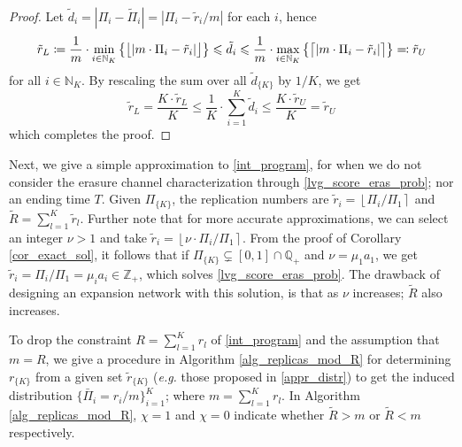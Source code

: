 \documentclass[journal,letterpaper,onecolumn,twoside,nofonttune]{IEEEtran}
\newcommand{\N}{\mathbb{N}}
\newcommand{\Z}{\mathbb{Z}}
\newcommand{\Q}{\mathbb{Q}}
\newcommand{\dhat}{\hat{d}}
\newcommand{\dt}{\tilde{d}}
\newcommand{\Rt}{\tilde{R}}
\newcommand{\rh}{\hat{r}}
\newcommand{\rt}{\tilde{r}}
\newcommand{\Pib}{\bar{\Pi}}
\newcommand{\Pit}{\tilde{\Pi}}
\DeclarePairedDelimiter\bceil{\big\lceil}{\big\rceil}
\DeclarePairedDelimiter\bfloor{\big\lfloor}{\big\rfloor}
\begin{document}
\begin{proof}
Let $\dt_i=|\Pi_i-\Pit_i|=|\Pi_i-\rt_i/m|$ for each $i$, hence
\begin{equation*}
\label{bd_mdi}
  \rt_L \coloneqq \frac{1}{m}\cdot\min_{i\in\N_K}\left\{\bfloor{|m\cdot\Pi_i-\rt_i|}\right\} \leqslant \dt_i \leqslant \frac{1}{m}\cdot\max_{i\in\N_K}\left\{\bceil{|m\cdot\Pi_i-\rt_i|}\right\} \eqqcolon \rt_U
\end{equation*}
for all $i\in\N_K$. By rescaling the sum over all $\dt_{\{K\}}$ by $1/K$, we get
\begin{equation*}
 \rt_L = \frac{K\cdot \rt_L}{K} \leqslant \frac{1}{K}\cdot\sum_{i=1}^K \dt_i \leqslant \frac{K\cdot \rt_U}{K} = \rt_U
\end{equation*}
which completes the proof.
\end{proof}

Next, we give a simple approximation to \eqref{int_program}, for when we do not consider the erasure channel characterization through \eqref{lvg_score_eras_prob}; nor an ending time $T$. Given $\Pi_{\{K\}}$, the replication numbers are $\rt_i = \left\lfloor\Pi_i/\Pi_1\right\rceil$ and $\Rt=\sum_{l=1}^K\rt_l$. Further note that for more accurate approximations, we can select an integer $\nu>1$ and take $\rt_i = \left\lfloor\nu\cdot\Pi_i/\Pi_1\right\rceil$. From the proof of Corollary \ref{cor_exact_sol}, it follows that if $\Pi_{\{K\}}\subsetneq[0,1]\cap\Q_+$ and $\nu=\mu_1 a_1$, we get $\rt_i = \Pi_i/\Pi_1 = \mu_i a_i\in\Z_+$, which solves \eqref{lvg_score_eras_prob}. The drawback of designing an expansion network with this solution, is that as $\nu$ increases; $\Rt$ also increases.

To drop the constraint $R=\sum_{l=1}^Kr_l$ of \eqref{int_program} and the assumption that $m=R$, we give a procedure in Algorithm \ref{alg_replicas_mod_R} for determining $r_{\{K\}}$ from a given set $\rt_{\{K\}}$ (\textit{e.g.} those proposed in \eqref{appr_distr}) to get the induced distribution $\{\Pib_i=r_i/m\}_{i=1}^K$; where $m=\sum_{l=1}^K r_l$. In Algorithm \ref{alg_replicas_mod_R}, $\chi=1$ and $\chi=0$ indicate whether $\Rt>m$ or $\Rt<m$ respectively.
\end{document}
